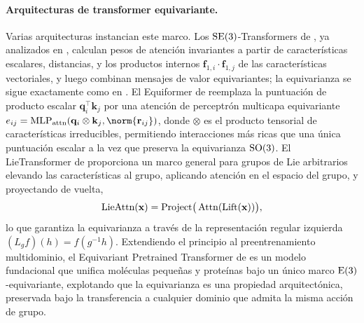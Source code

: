 \paragraph{Arquitecturas de transformer equivariante.}
Varias arquitecturas instancian este marco. Los $\operatorname{SE}(3)$-Transformers de
\citet{fuchs2020se3transformers}, ya analizados en ,
calculan pesos de atenci\'on invariantes a partir de caracter\'isticas escalares,
distancias, y los productos internos $\mathbf{f}_{1,i} \cdot \mathbf{f}_{1,j}$ de
las caracter\'isticas vectoriales, y luego combinan mensajes de valor
equivariantes; la equivarianza se sigue exactamente como en
. El Equiformer de
\citet{liao2022equiformer} reemplaza la puntuaci\'on de producto escalar
$\mathbf{q}_i^\top \mathbf{k}_j$ por una atenci\'on de perceptr\'on multicapa
equivariante $e_{ij} = \MLP_{\text{attn}}(\mathbf{q}_i \otimes \mathbf{k}_j,
\norm{\mathbf{r}_{ij}})$, donde $\otimes$ es el producto tensorial de
caracter\'isticas irreducibles, permitiendo interacciones m\'as ricas que una
\'unica puntuaci\'on escalar a la vez que preserva la equivarianza $\operatorname{SO}(3)$. El
LieTransformer de \citet{hutchinson2020lietransformer} proporciona un marco
general para grupos de Lie arbitrarios elevando las caracter\'isticas al grupo,
aplicando atenci\'on en el espacio del grupo, y proyectando de vuelta,
\begin{equation}
  \text{LieAttn}(\mathbf{x}) = \text{Project}\big(
    \operatorname{Attn}(\text{Lift}(\mathbf{x}))\big),
\end{equation}
lo que garantiza la equivarianza a trav\'es de la representaci\'on regular
izquierda $(L_g f)(h) = f(g^{-1} h)$. Extendiendo el principio al
preentrenamiento multidominio, el Equivariant Pretrained Transformer de
\citet{jiao2024ept} es un modelo fundacional que unifica mol\'eculas peque\~nas y
prote\'inas bajo un \'unico marco $\operatorname{E}(3)$-equivariante, explotando que la
equivarianza es una propiedad arquitect\'onica, preservada bajo la transferencia
a cualquier dominio que admita la misma acci\'on de grupo.

